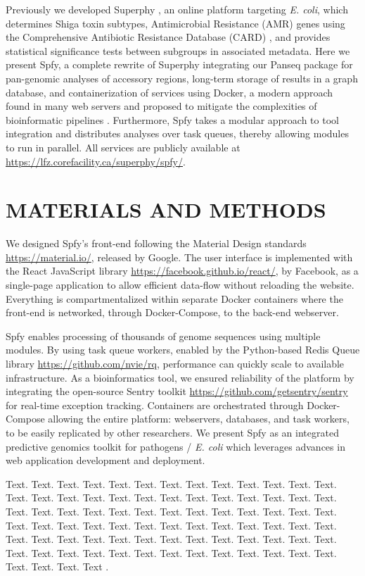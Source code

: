\documentclass[a4,center,fleqn]{NAR}
\begin{document}
Previously we developed Superphy \cite{whiteside2016superphy}, an online platform targeting \textit{E. coli}, which determines Shiga toxin subtypes, Antimicrobial Resistance (AMR) genes using the Comprehensive Antibiotic Resistance Database (CARD) \cite{mcarthur2013comprehensive}, and provides statistical significance tests between subgroups in associated metadata.
Here we present Spfy, a complete rewrite of Superphy integrating our Panseq package \cite{laing2010pan} for pan-genomic analyses of accessory regions, long-term storage of results in a graph database, and containerization of services using Docker, a modern approach found in many web servers and proposed to mitigate the complexities of bioinformatic pipelines \cite{di2015impact}.
Furthermore, Spfy takes a modular approach to tool integration and distributes analyses over task queues, thereby allowing modules to run in parallel.
All services are publicly available at \url{https://lfz.corefacility.ca/superphy/spfy/}.


\section{MATERIALS AND METHODS}
We designed Spfy's front-end following the Material Design standards \url{https://material.io/}, released by Google.
The user interface is implemented with the React JavaScript library \url{https://facebook.github.io/react/}, by Facebook, as a single-page application to allow efficient data-flow without reloading the website.
Everything is compartmentalized within separate Docker containers where the front-end is networked, through Docker-Compose, to the back-end webserver.

Spfy enables processing of thousands of genome sequences using multiple modules.
By using task queue workers, enabled by the Python-based Redis Queue library \url{https://github.com/nvie/rq}, performance can quickly scale to available infrastructure.
As a bioinformatics tool, we ensured reliability of the platform by integrating the open-source Sentry toolkit \url{https://github.com/getsentry/sentry} for real-time exception tracking.
Containers are orchestrated through Docker-Compose allowing the entire platform: webservers, databases, and task workers, to be easily replicated by other researchers.
We present Spfy as an integrated predictive genomics toolkit for pathogens / \textit{E. coli} which leverages advances in web application development and deployment.

Text. Text. Text. Text. Text. Text. Text. Text. Text. Text. Text.
Text. Text. Text. Text. Text. Text. Text. Text. Text. Text. Text.
Text. Text. Text. Text. Text. Text. Text. Text. Text. Text. Text.
Text. Text. Text. Text. Text. Text. Text. Text. Text. Text. Text.
Text. Text. Text. Text. Text. Text. Text. Text. Text. Text. Text.
Text. Text. Text. Text. Text. Text. Text. Text. Text. Text. Text.
Text. Text. Text. Text. Text. Text. Text. Text. Text. Text. Text.
Text. Text. Text{}. Text.
Text \cite{1}.
\end{document}

